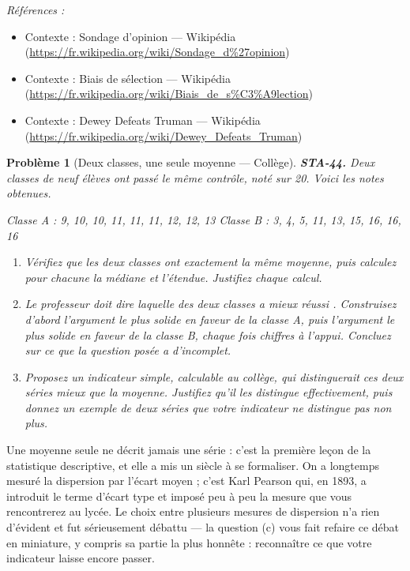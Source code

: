 \documentclass[11pt]{article}
\newtheorem{problem}{Problème}
\newenvironment{refs}{\par\small\noindent\emph{Références :}\begin{itemize}\setlength\itemsep{0pt}}{\end{itemize}\normalsize}
\begin{document}
\begin{refs}
\item Contexte : Sondage d'opinion --- Wikipédia (\url{https://fr.wikipedia.org/wiki/Sondage_d%27opinion})
\item Contexte : Biais de sélection --- Wikipédia (\url{https://fr.wikipedia.org/wiki/Biais_de_s%C3%A9lection})
\item Contexte : Dewey Defeats Truman --- Wikipédia (\url{https://fr.wikipedia.org/wiki/Dewey_Defeats_Truman})
\end{refs}

\bigskip

\begin{problem}[{Deux classes, une seule moyenne --- Collège}]
\textbf{STA-44.} Deux classes de neuf élèves ont passé le même contrôle, noté sur 20. Voici les
notes obtenues.

\noindent Classe A : 9, 10, 10, 11, 11, 11, 12, 12, 13 
Classe B : 3, 4, 5, 11, 13, 15, 16, 16, 16
\begin{enumerate}
\item[(a)] Vérifiez que les deux classes ont exactement la même moyenne, puis calculez pour chacune la
médiane et l'étendue. Justifiez chaque calcul.
\item[(b)] Le professeur doit dire laquelle des deux classes \og{} a mieux réussi \fg{}. Construisez d'abord
l'argument le plus solide en faveur de la classe A, puis l'argument le plus solide en faveur de la
classe B, chaque fois chiffres à l'appui. Concluez sur ce que la question posée a d'incomplet.
\item[(c)] Proposez un indicateur simple, calculable au collège, qui distinguerait ces deux séries mieux
que la moyenne. Justifiez qu'il les distingue effectivement, puis donnez un exemple de deux séries
que votre indicateur ne distingue pas non plus.
\end{enumerate}

\end{problem}

\noindent Une moyenne seule ne décrit jamais une série : c'est la première leçon de la
statistique descriptive, et elle a mis un siècle à se formaliser. On a longtemps mesuré la
dispersion par l'écart moyen ; c'est Karl Pearson qui, en 1893, a introduit le terme d'écart type
et imposé peu à peu la mesure que vous rencontrerez au lycée. Le choix entre plusieurs mesures de
dispersion n'a rien d'évident et fut sérieusement débattu --- la question (c) vous fait refaire ce
débat en miniature, y compris sa partie la plus honnête : reconnaître ce que votre indicateur
laisse encore passer.
\end{document}
